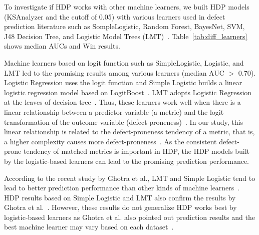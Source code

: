 To investigate if
HDP works with other machine learners, we built HDP models (KSAnalyzer and
the cutoff of 0.05) with various learners used in defect prediction
literature such as SompleLogistic, Random Forest, BayesNet, SVM, J48 Decision
Tree, and Logistic Model Trees
(LMT)~\cite{DAmbros12,Ghotra15,Lee11,Lessmann08,Nam13,Song11,Ghotra15}.
Table~\ref{tab:diff_learners} shows median AUCs and Win results.

Machine learners based on logit function such as SimpleLogistic, Logistic, and LMT led to the promising results among various learners (median AUC $>$ 0.70).
Logistic Regression uses the logit function and Simple Logistic builds a linear logistic regression model based on LogitBoost~\cite{Landwehr2005}.
LMT adopts Logistic Regression at the leaves of decision tree~\cite{Ghotra15}.
Thus, these learners work well when there is a linear
relationship between a predictor variable (a metric) and the logit
transformation of the outcome variable (defect-proneness)~\cite{Landwehr2005,Logstic}.
In our study, this linear relationship is related to the defect-proneness tendency of
a metric, that is, a higher complexity causes more defect-proneness~\cite{DAmbros12,Menzies07,Rahman13}.
As the consistent defect-prone tendency of matched metrics is important in HDP, the
HDP models built by  the logistic-based learners can lead to the promising prediction
performance.


According to the recent study by Ghotra et al., LMT and Simple Logistic tend to lead to better prediction performance than other kinds of machine learners~\cite{Ghotra15}. HDP results based on Simple Logistic and LMT also confirm the results by Ghotra et al.~\cite{Ghotra15}. However, these results do not generalize HDP works best by logistic-based learners as Ghotra et al. also pointed out prediction results and the best machine learner may vary based on each dataset~\cite{Ghotra15}.

